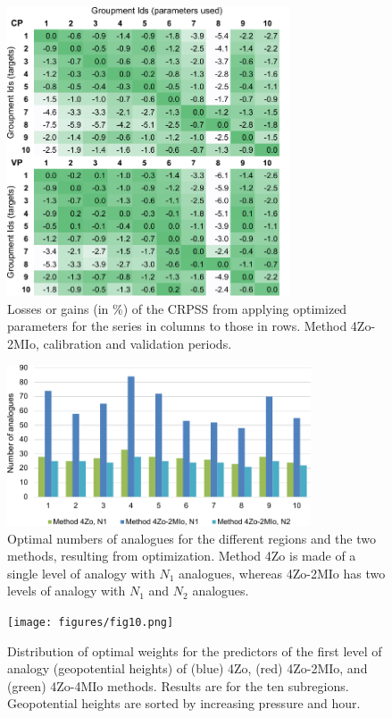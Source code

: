 \documentclass[review]{elsarticle}
\begin{document}
\begin{figure}[t]
	\centerline{\includegraphics[width=8.4cm]{figures/fig08.pdf}}
	\caption{Losses or gains (in \%) of the CRPSS from applying optimized parameters for the series in columns to those in rows. Method 4Zo-2MIo, calibration and validation periods.}
	\label{fig:crossing_4Zo-2MIo}
\end{figure}

\begin{figure}[t]
	\centerline{\includegraphics[width=9cm]{figures/fig09.pdf}}
	\caption{Optimal numbers of analogues for the different regions and the two methods, resulting from optimization. Method 4Zo is made of a single level of analogy with $N_{1}$ analogues, whereas 4Zo-2MIo has two levels of analogy with $N_{1}$ and $N_{2}$ analogues.}
	\label{fig:figure_nb_analogs}
\end{figure}

\begin{figure}[t]
	\centerline{\texttt{[image: figures/fig10.png]}}
	\caption{Distribution of optimal weights for the predictors of the first level of analogy (geopotential heights) of (blue) 4Zo, (red) 4Zo-2MIo, and (green) 4Zo-4MIo methods. Results are for the ten subregions. Geopotential heights are sorted by increasing pressure and hour.}
	\label{fig:levels_weights_average}
\end{figure}
\end{document}
